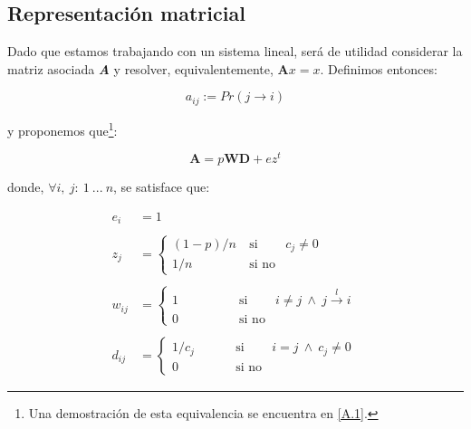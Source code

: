 \vspace{2em}
\subsection{Representación matricial} Dado que estamos trabajando con un sistema lineal, será de utilidad considerar la matriz asociada \textbf{\textit{A}} y resolver, equivalentemente, $\textbf{A}x = x$. Definimos entonces:

\begin{equation}
    a_{ij} := Pr(j \longrightarrow i)
\end{equation}

\vspace{1em}
\noindent y proponemos que\footnote{Una demostración de esta equivalencia se encuentra en \ref{A.1}.}:

\begin{equation}
    \textbf{A} = p\textbf{W}\textbf{D} + ez^t
\end{equation}

\vspace{1em}
\noindent donde, $\forall i,\ j:\ 1\ ...\ n$, se satisface que:

\begin{align*}
    e_i     &=  1
    \\
    \\
    z_{j}   &=  \left\{ 
                    \begin{array}{lcc}
                    (1 - p) / n     &  \: \text{si}    &  c_j \neq 0 \\
                    1 / n           &  \: \text{si no} &
                    \end{array}
                \right.\
    \\
    \\
    w_{ij}  &=  \left\{ 
                    \begin{array}{lcc}
                    1               &  \qquad \qquad \text{si}    & i \neq j\  \wedge\ j \stackrel{l}{\longrightarrow} i \\
                    0               &  \qquad \qquad \text{si no} &
                    \end{array}
                \right.\
    \\
    \\
    d_{ij}  &=  \left\{ 
                    \begin{array}{lcc}
                    1 / c_j         &  \qquad \: \: \text{si}    & i = j\  \wedge\ c_j \neq 0 \\
                    0               &  \qquad \ \  \text{si no} &
                    \end{array}
                \right.\
\end{align*}
\vspace{1em}

